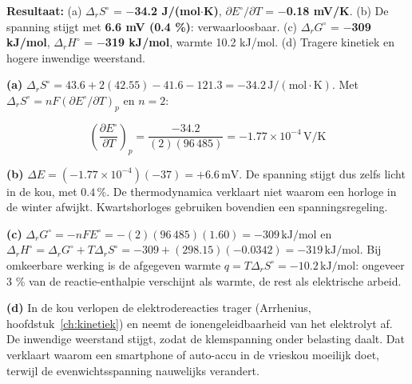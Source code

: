 \begin{oplossing}
\textbf{Resultaat:} (a) \(\Delta_r S^\circ\) = \textbf{\ensuremath{-}34.2 J/(mol\ensuremath{\cdot{}}K)}, \(\partial E^\circ/\partial T\) = \textbf{\ensuremath{-}0.18 mV/K}. (b) De spanning stijgt met \textbf{6.6 mV (0.4 \%)}: verwaarloosbaar. (c) \(\Delta_r G^\circ\) = \textbf{\ensuremath{-}309 kJ/mol}, \(\Delta_r H^\circ\) = \textbf{\ensuremath{-}319 kJ/mol}, warmte 10.2 kJ/mol. (d) Tragere kinetiek en hogere inwendige weerstand.

\textbf{(a)} \(\Delta_r S^\circ = 43.6 + 2(42.55) - 41.6 - 121.3 = -34.2\,\mathrm{J/(mol\cdot K)}\). Met \(\Delta_r S^\circ = nF(\partial E^\circ/\partial T)_p\) en \(n = 2\):

\[
\left(\frac{\partial E^\circ}{\partial T}\right)_p = \frac{-34.2}{(2)(96\,485)} = -1.77\times10^{-4}\,\mathrm{V/K}
\]

\textbf{(b)} \(\Delta E = (-1.77\times10^{-4})(-37) = +6.6\,\mathrm{mV}\). De spanning stijgt dus zelfs licht in de kou, met \(0.4\,\%\). De thermodynamica verklaart niet waarom een horloge in de winter afwijkt. Kwartshorloges gebruiken bovendien een spanningsregeling.

\textbf{(c)} \(\Delta_r G^\circ = -nFE^\circ = -(2)(96\,485)(1.60) = -309\,\mathrm{kJ/mol}\) en \(\Delta_r H^\circ = \Delta_r G^\circ + T\Delta_r S^\circ = -309 + (298.15)(-0.0342) = -319\,\mathrm{kJ/mol}\). Bij omkeerbare werking is de afgegeven warmte \(q = T\Delta_r S^\circ = -10.2\,\mathrm{kJ/mol}\): ongeveer 3 \% van de reactie-enthalpie verschijnt als warmte, de rest als elektrische arbeid.

\textbf{(d)} In de kou verlopen de elektrodereacties trager (Arrhenius, hoofdstuk~\ref{ch:kinetiek}) en neemt de ionengeleidbaarheid van het elektrolyt af. De inwendige weerstand stijgt, zodat de klemspanning onder belasting daalt. Dat verklaart waarom een smartphone of auto-accu in de vrieskou moeilijk doet, terwijl de evenwichtsspanning nauwelijks verandert.
\end{oplossing}

